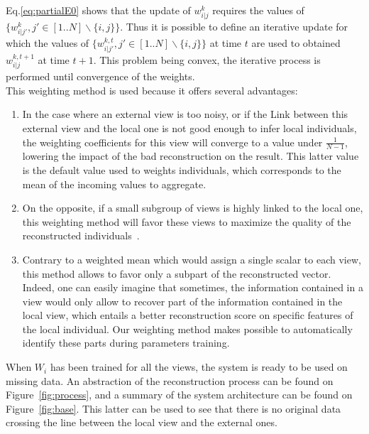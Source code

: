 Eq.\ref{eq:partialE0} shows that the update of $w_{i|j}^k$ requires the values of $\{w_{i|j'}^k, j'\in[1..N]\backslash \{i,j\}\}$. Thus it is possible to define an iterative update for which the values of $\{w_{i|j'}^{k,t}, j'\in[1..N]\backslash \{i,j\}\}$ at time $t$ are used to obtained $w_{i|j}^{k,t+1}$ at time $t+1$. This problem being convex, the iterative process is performed until convergence of the weights.\\
		
This weighting method is used because it offers several advantages:
		\begin{enumerate}
    \item In the case where an external view is too noisy, or if the Link between this external view and the local one is not good enough to infer local individuals, the weighting coefficients for this view will converge to a value under $\frac{1}{N-1}$, lowering the impact of the bad reconstruction on the result. This latter value is the default value used to weights individuals, which corresponds to the mean of the incoming values to aggregate.
    \item On the opposite, if a small subgroup of views is highly linked to the local one, this weighting method will favor these views to maximize the quality of the reconstructed individuals~\cite{sublime2017analysis,sublime2018analysis}.
    \item Contrary to a weighted mean which would assign a single scalar to each view, this method allows to favor only a subpart of the reconstructed vector. Indeed, one can easily imagine that sometimes, the information contained in a view would only allow to recover part of the information contained in the local view, which entails a better reconstruction score on specific features of the local individual. Our weighting method makes possible to automatically identify these parts during parameters training.
		\end{enumerate}
		
When $W_i$ has been trained for all the views, the system is ready to be used on missing data. An abstraction of the reconstruction process can be found on Figure~\ref{fig:process}, and a summary of the system architecture can be found on Figure~\ref{fig:base}. This latter can be used to see that there is no original data crossing the line between the local view and the external ones.
	
